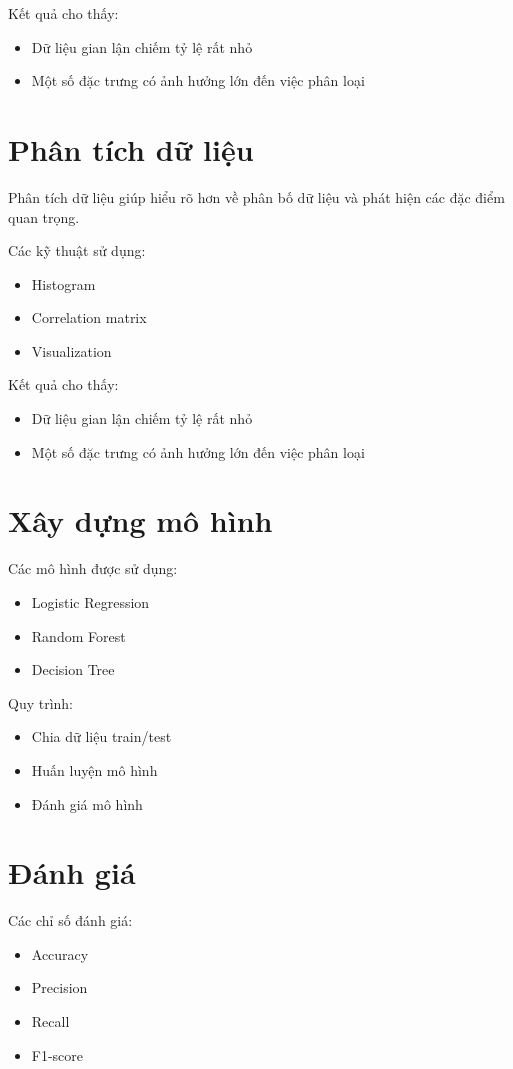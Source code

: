 Kết quả cho thấy:
\begin{itemize}
    \item Dữ liệu gian lận chiếm tỷ lệ rất nhỏ
    \item Một số đặc trưng có ảnh hưởng lớn đến việc phân loại
\end{itemize}
\section{Phân tích dữ liệu}

Phân tích dữ liệu giúp hiểu rõ hơn về phân bố dữ liệu và phát hiện các đặc điểm quan trọng.

Các kỹ thuật sử dụng:
\begin{itemize}
    \item Histogram
    \item Correlation matrix
    \item Visualization
\end{itemize}

Kết quả cho thấy:
\begin{itemize}
    \item Dữ liệu gian lận chiếm tỷ lệ rất nhỏ
    \item Một số đặc trưng có ảnh hưởng lớn đến việc phân loại
\end{itemize}
\section{Xây dựng mô hình}

Các mô hình được sử dụng:

\begin{itemize}
    \item Logistic Regression
    \item Random Forest
    \item Decision Tree
\end{itemize}

Quy trình:
\begin{itemize}
    \item Chia dữ liệu train/test
    \item Huấn luyện mô hình
    \item Đánh giá mô hình
\end{itemize}
\section{Đánh giá}

Các chỉ số đánh giá:
\begin{itemize}
    \item Accuracy
    \item Precision
    \item Recall
    \item F1-score
\end{itemize}

